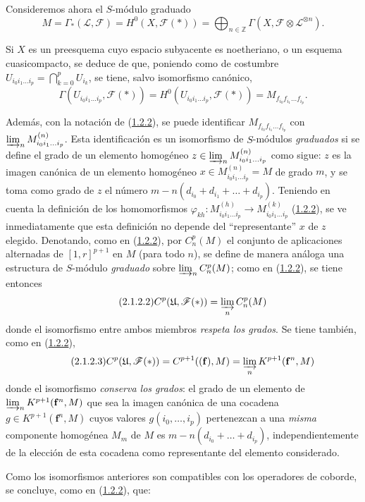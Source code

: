 \begin{env}[2.1.2]
\label{III.2.1.2}
\label{III.2.1.2-fr}
Consideremos ahora el $S$-módulo graduado 
\begin{equation}
\label{III.2.1.2.1-fr}
\tag{2.1.2.1}
M=\Gamma_*(\mathcal L,\mathcal F)
=H^0(X,\mathcal F(*))
=\bigoplus_{n\in\mathbb Z}
\Gamma(X,\mathcal F\otimes\mathcal L^{\otimes n}).
\end{equation}

Si $X$ es un preesquema cuyo espacio subyacente es noetheriano, o un esquema cuasicompacto, se deduce de  que, poniendo como de costumbre $U_{i_0i_1\ldots i_p}=\bigcap_{k=0}^pU_{i_k}$, se tiene, salvo isomorfismo canónico,
\[
\Gamma(U_{i_0i_1\ldots i_p},\mathcal F(*))
=H^0(U_{i_0i_1\ldots i_p},\mathcal F(*))
=M_{f_{i_0}f_{i_1}\ldots f_{i_p}}.
\]

Además, con la notación de (\hyperref[III.1.2.2]{1.2.2}), se puede identificar $M_{f_{i_0}f_{i_1}\ldots f_{i_p}}$ con $\varinjlim_n M_{i_0i_1\ldots i_p}^{(n)}$.
Esta identificación es un isomorfismo de $S$-módulos \emph{graduados} si se define el grado de un elemento homogéneo $z\in\varinjlim_n M_{i_0i_1\ldots i_p}^{(n)}$ como sigue: $z$ es la imagen canónica de un elemento homogéneo $x\in M_{i_0i_1\ldots i_p}^{(n)}=M$ de grado $m$, y se toma como grado de $z$ el número $m-n(d_{i_0}+d_{i_1}+\ldots+d_{i_p})$.
Teniendo en cuenta la definición de los homomorfismos $\varphi_{kh}:M_{i_0i_1\ldots i_p}^{(h)}\to
M_{i_0i_1\ldots i_p}^{(k)}$ (\hyperref[III.1.2.2]{1.2.2}), se ve inmediatamente que esta definición no depende del ``representante'' $x$ de $z$ elegido.
Denotando, como en (\hyperref[III.1.2.2]{1.2.2}), por $C_n^p(M)$ el conjunto de aplicaciones alternadas de $[1,r]^{p+1}$ en $M$ (para todo $n$), se define de manera análoga una estructura de $S$-módulo \emph{graduado} sobre $\varinjlim_n C_n^p(M)$; como en (\hyperref[III.1.2.2]{1.2.2}), se tiene entonces
\begin{equation}
\label{III.2.1.2.2-fr}
\tag{2.1.2.2}
C^p(\mathfrak U,\mathcal F(*))=\varinjlim_n C_n^p(M)
\end{equation}
donde el isomorfismo entre ambos miembros \emph{respeta los grados}.
Se tiene también, como en (\hyperref[III.1.2.2]{1.2.2}),
\begin{equation}
\label{III.2.1.2.3-fr}
\tag{2.1.2.3}
C^p(\mathfrak U,\mathcal F(*))
=C^{p+1}((\mathbf f),M)
=\varinjlim_n K^{p+1}(\mathbf f^n,M)
\end{equation}
donde el isomorfismo \emph{conserva los grados}: el grado de un elemento de $\varinjlim_n K^{p+1}(\mathbf f^n,M)$ que sea la imagen canónica de una cocadena $g\in K^{p+1}(\mathbf f^n,M)$ cuyos valores $g(i_0,\ldots,i_p)$ pertenezcan a una \emph{misma} componente homogénea $M_m$ de $M$ es $m-n(d_{i_0}+\ldots+d_{i_p})$, independientemente de la elección de esta cocadena como representante del elemento considerado.

Como los isomorfismos anteriores son compatibles con los operadores de coborde, se concluye, como en (\hyperref[III.1.2.2]{1.2.2}), que:
\end{env}

